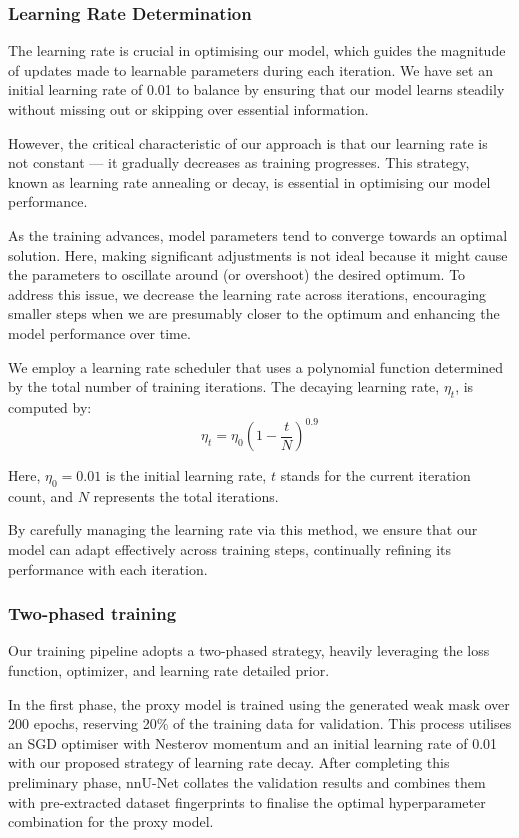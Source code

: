 \subsubsection*{Learning Rate Determination}
The learning rate is crucial in optimising our model, which guides the magnitude of updates made to learnable parameters during each iteration. We have set an initial learning rate of 0.01 to balance by ensuring that our model learns steadily without missing out or skipping over essential information.

However, the critical characteristic of our approach is that our learning rate is not constant — it gradually decreases as training progresses. This strategy, known as learning rate annealing or decay, is essential in optimising our model performance.

As the training advances, model parameters tend to converge towards an optimal solution. Here, making significant adjustments is not ideal because it might cause the parameters to oscillate around (or overshoot) the desired optimum. To address this issue, we decrease the learning rate across iterations, encouraging smaller steps when we are presumably closer to the optimum and enhancing the model performance over time.

We employ a learning rate scheduler that uses a polynomial function determined by the total number of training iterations. The decaying learning rate, \( \eta_{t} \), is computed by:
\[
\eta_{t} = \eta_{0}(1 - \frac{t}{N})^{0.9}
\]

Here, \( \eta_{0} = 0.01 \) is the initial learning rate, \( t \) stands for the current iteration count, and \( N \) represents the total iterations.

By carefully managing the learning rate via this method, we ensure that our model can adapt effectively across training steps, continually refining its performance with each iteration.

\subsubsection*{Two-phased training}
Our training pipeline adopts a two-phased strategy, heavily leveraging the loss function, optimizer, and learning rate detailed prior.

In the first phase, the proxy model is trained using the generated weak mask over 200 epochs, reserving 20\% of the training data for validation. This process utilises an SGD optimiser with Nesterov momentum and an initial learning rate of 0.01 with our proposed strategy of learning rate decay. After completing this preliminary phase, nnU-Net collates the validation results and combines them with pre-extracted dataset fingerprints to finalise the optimal hyperparameter combination for the proxy model.

